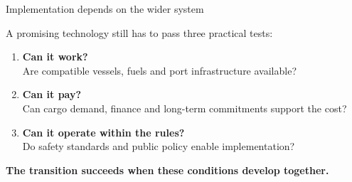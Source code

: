 \documentclass[aspectratio=169,11pt]{beamer}
\begin{document}
\begin{frame}{Implementation depends on the wider system}
  \vspace{0.12cm}
  {\color{Ink}\fontsize{11.7}{15.2}\selectfont
    A promising technology still has to pass three practical tests:
    \vspace{0.2cm}
    \begin{enumerate}
      \setlength{\itemsep}{0.24cm}
      \item \textbf{Can it work?}\\
        Are compatible vessels, fuels and port infrastructure available?
      \item \textbf{Can it pay?}\\
        Can cargo demand, finance and long-term commitments support the cost?
      \item \textbf{Can it operate within the rules?}\\
        Do safety standards and public policy enable implementation?
    \end{enumerate}
  }

  \vfill
  {\color{Navy}\fontsize{10.2}{13.2}\selectfont\bfseries
    The transition succeeds when these conditions develop together.
  \par}
\end{frame}
\end{document}
